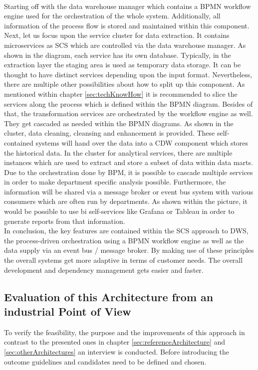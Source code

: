 \\
Starting off with the data warehouse manager which contains a BPMN workflow engine used for the orchestration of the whole system. Additionally, all information of the process flow is stored and maintained within this component. \newline
Next, let us focus upon the service cluster for data extraction. It contains microservices as SCS which are controlled via the data warehouse manager. As shown in the diagram, each service has its own database. Typically, in the extraction layer the staging area is used as temporary data storage.  It can be thought to have distinct services depending upon the input format. Nevertheless, there are multiple other possibilities about how to split up this component. As mentioned within chapter \ref{sec:techKnowHow} it is recommended to slice the services along the process which is defined within the BPMN diagram.\newline
Besides of that, the transformation services are orchestrated by the workflow engine as well. They get cascaded as needed within the BPMN diagrams. As shown in the cluster, data cleaning, cleansing and enhancement is provided. These self-contained systems will hand over the data into a CDW component which stores the historical data.\newline
In the cluster for analytical services, there are multiple instances which are used to extract and store a subset of data within data marts. Due to the orchestration done by BPM, it is possible to cascade multiple services in order to make department specific analysis possible. Furthermore, the information will be shared via a message broker or event bus system with various consumers which are often run by departments. As shown within the picture, it would be possible to use \acrshort{bi} self-services like Grafana or Tableau in order to generate reports from that information.\newline
\\
In conclusion, the key features are contained within the SCS approach to DWS, the process-driven orchestration using a BPMN workflow engine as well as the data supply via an event bus / message broker. By making use of these principles the overall systems get more adaptive in terms of customer needs. The overall development and dependency management gets easier and faster. 

\subsection{Evaluation of this Architecture from an industrial Point of View}
To verify the feasibility, the purpose and the improvements of this approach in contrast to the presented ones in chapter \ref{sec:referenceArchitecture} and \ref{sec:otherArchitectures} an interview is conducted. Before introducing the outcome guidelines and candidates need to be defined and chosen.

